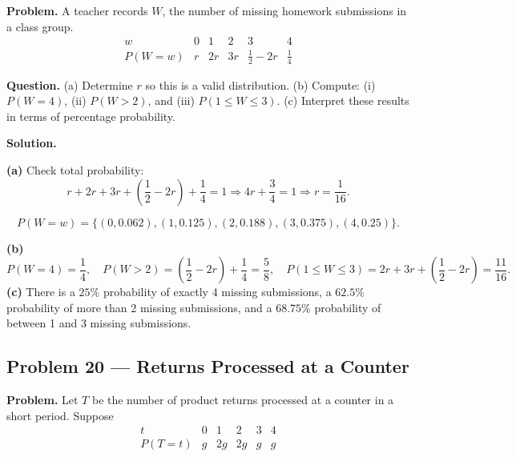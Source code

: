 \begin{ExamProblems}
		\textbf{Problem.}
		A teacher records $W$, the number of missing homework submissions in a class group.
		\[
		\begin{array}{c|ccccc}
			w & 0 & 1 & 2 & 3 & 4\\
			\hline
			P(W=w) & r & 2r & 3r & \frac{1}{2}-2r & \frac{1}{4}
		\end{array}
		\]
		
		\textbf{Question.}
		(a) Determine $r$ so this is a valid distribution.
		(b) Compute: (i) $P(W=4)$, (ii) $P(W>2)$, and (iii) $P(1\le W\le 3)$.
		(c) Interpret these results in terms of percentage probability.
		
		\textbf{Solution.}

		\textbf{(a)} Check total probability:
		\[
		r+2r+3r+\left(\frac{1}{2}-2r\right)+\frac{1}{4}=1
		\Rightarrow 4r+\frac{3}{4}=1
		\Rightarrow r=\frac{1}{16}.
		\]

		
\[
		P(W=w)=\{(0,0.062),(1,0.125),(2,0.188),(3,0.375),(4,0.25)\}.
		\]
\begin{center}
		\end{center}
\textbf{(b)}
		\[
		P(W=4)=\frac{1}{4},\quad
		P(W>2)=\left(\frac{1}{2}-2r\right)+\frac{1}{4}=\frac{5}{8},\quad
		P(1\le W\le 3)=2r+3r+\left(\frac{1}{2}-2r\right)=\frac{11}{16}.
		\]
		\textbf{(c)} There is a $25\%$ probability of exactly 4 missing submissions, a $62.5\%$ probability of more than 2 missing submissions, and a $68.75\%$ probability of between 1 and 3 missing submissions.
		
		
		\item
		\subsection*{Problem 20 — Returns Processed at a Counter}
		
		\textbf{Problem.}
		Let $T$ be the number of product returns processed at a counter in a short period. Suppose
		\[
		\begin{array}{c|ccccc}
			t & 0 & 1 & 2 & 3 & 4\\
			\hline
			P(T=t) & g & 2g & 2g & g & g
		\end{array}
		\]
		

\end{ExamProblems}
